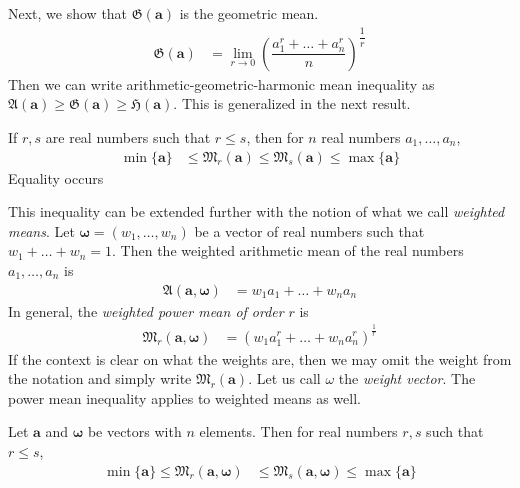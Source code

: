 \documentclass{subfile}
\begin{document}
	Next, we show that $\mathfrak{G}(\mathbf{a})$ is the geometric mean.
		\begin{align*}
			\mathfrak{G}(\mathbf{a})
				& = \lim\limits_{r\to0}\left(\dfrac{a_1^r+\ldots+a_n^r}{n}\right)^{\dfrac{1}{r}}
		\end{align*}
	Then we can write arithmetic-geometric-harmonic mean inequality as $\mathfrak{A}(\mathbf{a})\geq\mathfrak{G}(\mathbf{a})\geq \mathfrak{H}(\mathbf{a})$. This is generalized in the next result.
		\begin{theorem}
			If $r,s$ are real numbers such that $r\leq s$, then for $n$ real numbers $a_1,\ldots,a_n$,
				\begin{align*}
					\min\{\mathbf{a}\}
						& \leq \mathfrak{M}_r(\mathbf{a})\leq \mathfrak{M}_s(\mathbf{a})\leq\max\{\mathbf{a}\}
				\end{align*}
			Equality occurs 
		\end{theorem}
	This inequality can be extended further with the notion of what we call \textit{weighted means}. Let $\mathbf{\omega}=(w_{1},\ldots,w_{n})$ be a vector of real numbers such that $w_{1}+\ldots+w_{n}=1$. Then the weighted arithmetic mean of the real numbers $a_{1},\ldots,a_{n}$ is
		\begin{align*}
			\mathfrak{A}(\mathbf{a},\mathbf{\omega})
				& = w_{1}a_{1}+\ldots+w_{n}a_{n}
		\end{align*}
	In general, the \textit{weighted power mean of order} $r$ is
		\begin{align*}
			\mathfrak{M}_{r}(\mathbf{a},\mathbf{\omega})
				& = \left(w_{1}a_{1}^{r}+\ldots+w_{n}a_{n}^{r}\right)^{\frac{1}{r}}
		\end{align*}
	If the context is clear on what the weights are, then we may omit the weight from the notation and simply write $\mathfrak{M}_{r}(\mathbf{a})$. Let us call $\omega$ the \textit{weight vector}. The power mean inequality applies to weighted means as well.
		\begin{theorem}\label{thm:weightedpowermean}
			Let $\mathbf{a}$ and $\mathbf{\omega}$ be vectors with $n$ elements. Then for real numbers $r,s$ such that $r\leq s$,
				\begin{align*}
					\min\{\mathbf{a}\} \leq \mathfrak{M}_{r}(\mathbf{a},\mathbf{\omega})
						& \leq \mathfrak{M}_{s}(\mathbf{a},\mathbf{\omega})\leq \max\{\mathbf{a}\}
				\end{align*}
		\end{theorem}
\end{document}
